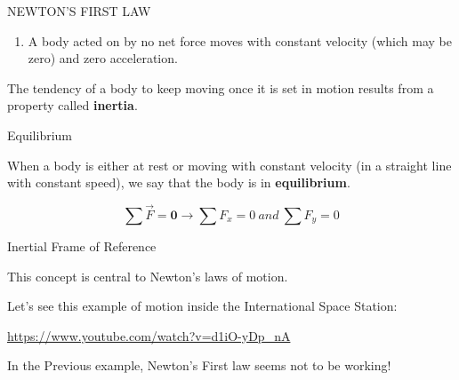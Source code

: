 \documentclass[]{beamer}
\begin{document}
 \begin{frame}

NEWTON'S FIRST LAW
\vspace{5mm}

 \begin{enumerate}
   \item A body acted on by no net force moves with
   constant velocity (which may be zero) and zero acceleration.
 \end{enumerate}
  \pause

 The tendency of a body to keep moving once it is set in motion results from a
 property called \textbf{inertia}.
 
 \end{frame}



 \begin{frame}
 Equilibrium
  \vspace{5mm}

  When a body is either at rest or moving with constant velocity (in a straight
  line with constant speed), we say that the body is in \textbf{equilibrium}.

  \begin{equation*}
    \sum \vec{F}=\textbf{0}\rightarrow \sum F_x=0~and~\sum F_y=0
  \end{equation*}
   


   \end{frame}


 \begin{frame}
  Inertial Frame of Reference
    \vspace{5mm}
  
  
    This concept is central to Newton’s laws of motion.
    \vspace{5mm}
    \pause

    Let's see this example of motion inside the International Space Station:

    \vspace{5mm}

\url{https://www.youtube.com/watch?v=d1iO-yDp_nA}
     
\pause
   \vspace{5mm}


In the Previous example, Newton's First law seems not to be working! 
  
\end{frame}
\end{document}

